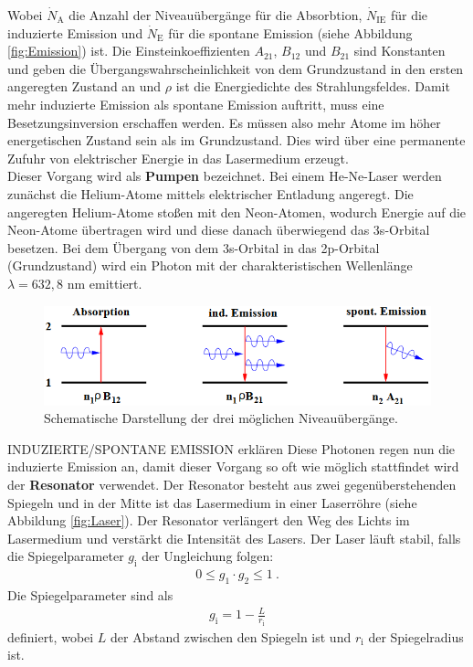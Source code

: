Wobei $\dot{N}_\text{A}$ die Anzahl der Niveauübergänge für die Absorbtion, $\dot{N}_\text{IE}$ für die induzierte Emission und $\dot{N}_\text{E}$ für die spontane Emission (siehe Abbildung \eqref{fig:Emission}) ist. Die Einsteinkoeffizienten $A_{21}$, $B_{12}$ und $B_{21}$ sind Konstanten und geben die Übergangswahrscheinlichkeit von dem Grundzustand in den ersten angeregten Zustand an und $\rho$ ist die Energiedichte des Strahlungsfeldes. Damit mehr induzierte Emission als spontane Emission auftritt, muss eine Besetzungsinversion erschaffen werden. Es müssen also mehr Atome im höher energetischen Zustand sein als im Grundzustand. Dies wird über eine permanente Zufuhr von elektrischer Energie in das Lasermedium erzeugt. \\
Dieser Vorgang wird als \textbf{Pumpen} bezeichnet. Bei einem He-Ne-Laser werden zunächst die Helium-Atome mittels elektrischer Entladung angeregt. Die angeregten Helium-Atome stoßen mit den Neon-Atomen, wodurch Energie auf die Neon-Atome übertragen wird und diese danach überwiegend das 3s-Orbital besetzen. Bei dem Übergang von dem 3s-Orbital in das 2p-Orbital (Grundzustand) wird ein Photon mit der charakteristischen Wellenlänge $\lambda = 632,8$ nm emittiert.

\begin{figure}[H]
	\includegraphics[width=\linewidth]{Bilder/Emission.PNG}
	\caption{Schematische Darstellung der drei möglichen Niveauübergänge. \cite{V61}}
	\label{fig:Emission}
\end{figure}

INDUZIERTE/SPONTANE EMISSION erklären
Diese Photonen regen nun die induzierte Emission an, damit dieser Vorgang so oft wie möglich stattfindet wird der \textbf{Resonator} verwendet. Der Resonator besteht aus zwei gegenüberstehenden Spiegeln und in der Mitte ist das Lasermedium in einer Laserröhre (siehe Abbildung \eqref{fig:Laser}). Der Resonator verlängert den Weg des Lichts im Lasermedium und verstärkt die Intensität des Lasers. Der Laser läuft stabil, falls die Spiegelparameter $g_\text{i}$ der Ungleichung folgen:
\begin{align}
	0 \le g_1 \cdot g_2 \le 1 \ .
	\label{eqn:Stab}
\end{align}
Die Spiegelparameter sind als
\begin{align}
	g_\text{i} = 1 - \frac{L}{r_\text{i}}
\end{align}
definiert, wobei $L$ der Abstand zwischen den Spiegeln ist und $r_\text{i}$ der Spiegelradius ist.

